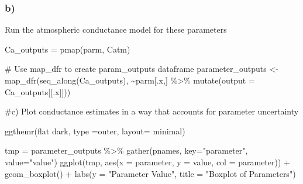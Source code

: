 \documentclass[
  letterpaper,
  DIV=11,
  numbers=noendperiod]{scrartcl}
\newenvironment{Shaded}{\begin{snugshade}}{\end{snugshade}}
\newcommand{\AttributeTok}[1]{\textcolor[rgb]{0.40,0.45,0.13}{#1}}
\newcommand{\CommentTok}[1]{\textcolor[rgb]{0.37,0.37,0.37}{#1}}
\newcommand{\FunctionTok}[1]{\textcolor[rgb]{0.28,0.35,0.67}{#1}}
\newcommand{\NormalTok}[1]{\textcolor[rgb]{0.00,0.23,0.31}{#1}}
\newcommand{\OtherTok}[1]{\textcolor[rgb]{0.00,0.23,0.31}{#1}}
\newcommand{\SpecialCharTok}[1]{\textcolor[rgb]{0.37,0.37,0.37}{#1}}
\newcommand{\StringTok}[1]{\textcolor[rgb]{0.13,0.47,0.30}{#1}}
\begin{document}
\hypertarget{b}{%
\subsubsection{b)}\label{b}}

Run the atmospheric conductance model for these parameters

\begin{Shaded}
\begin{Highlighting}[]
\NormalTok{Ca\_outputs }\OtherTok{=} \FunctionTok{pmap}\NormalTok{(parm, Catm)}

\CommentTok{\# Use map\_dfr to create param\_outputs dataframe}
\NormalTok{parameter\_outputs }\OtherTok{\textless{}{-}} \FunctionTok{map\_dfr}\NormalTok{(}\FunctionTok{seq\_along}\NormalTok{(Ca\_outputs), }\SpecialCharTok{\textasciitilde{}}\NormalTok{parm[.x,] }\SpecialCharTok{\%\textgreater{}\%} \FunctionTok{mutate}\NormalTok{(}\AttributeTok{output =}\NormalTok{ Ca\_outputs[[.x]]))}
\end{Highlighting}
\end{Shaded}

\#c) Plot conductance estimates in a way that accounts for parameter
uncertainty

\begin{Shaded}
\begin{Highlighting}[]
\FunctionTok{ggthemr}\NormalTok{(}\StringTok{\textquotesingle{}flat dark\textquotesingle{}}\NormalTok{, }\AttributeTok{type =}\StringTok{\textquotesingle{}outer\textquotesingle{}}\NormalTok{, }\AttributeTok{layout=} \StringTok{\textquotesingle{}minimal\textquotesingle{}}\NormalTok{)}

\NormalTok{tmp }\OtherTok{=}\NormalTok{ parameter\_outputs }\SpecialCharTok{\%\textgreater{}\%} \FunctionTok{gather}\NormalTok{(pnames, }\AttributeTok{key=}\StringTok{"parameter"}\NormalTok{, }\AttributeTok{value=}\StringTok{"value"}\NormalTok{)}
\FunctionTok{ggplot}\NormalTok{(tmp, }\FunctionTok{aes}\NormalTok{(}\AttributeTok{x =}\NormalTok{ parameter, }\AttributeTok{y =}\NormalTok{ value, }\AttributeTok{col =}\NormalTok{ parameter)) }\SpecialCharTok{+}
  \FunctionTok{geom\_boxplot}\NormalTok{() }\SpecialCharTok{+}
  \FunctionTok{labs}\NormalTok{(}\AttributeTok{y =} \StringTok{"Parameter Value"}\NormalTok{, }\AttributeTok{title =} \StringTok{"Boxplot of Parameters"}\NormalTok{)}
\end{Highlighting}
\end{Shaded}
\end{document}
